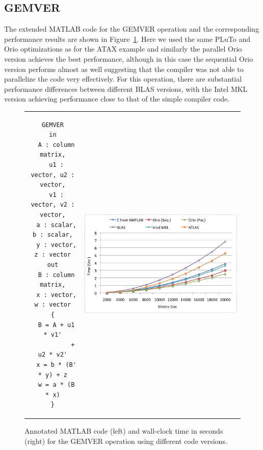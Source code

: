 \documentclass[11pt]{article}
\begin{document}
\subsection{GEMVER}


The extended MATLAB code for the GEMVER operation and the corresponding performance results are shown in Figure~\ref{fig:gemver}. Here we used the same PLuTo and Orio optimizations as for the ATAX example and similarly the parallel Orio version achieves the best performance, although in this case the sequential Orio version performs almost as well suggesting that the compiler was not able to parallelize the code very effectively. For this operation, there are substantial performance differences between different BLAS versions, with the Intel MKL version achieving performance close to that of the simple compiler code.
\begin{figure}[htp]
\centering
\begin{tabular}{cc}
\begin{minipage}[b]{.3\textwidth}
\footnotesize
\begin{verbatim}
GEMVER
in
  A : column matrix,
  u1 : vector, u2 : vector,
  v1 : vector, v2 : vector,
  a : scalar, b : scalar,
  y : vector, z : vector
out
  B : column matrix,
  x : vector, w : vector
{
  B = A + u1 * v1'
           + u2 * v2'
  x = b * (B' * y) + z
  w = a * (B * x)
}
\end{verbatim}
\end{minipage}
&
\begin{minipage}[b]{.6\textwidth}
\includegraphics[width=\textwidth]{figures/gemver.png}
\end{minipage}\\
\end{tabular}
\caption{Annotated MATLAB code (left) and wall-clock time in seconds (right) for the GEMVER operation using different code versions.}
\label{fig:gemver}
\end{figure}
\end{document}
